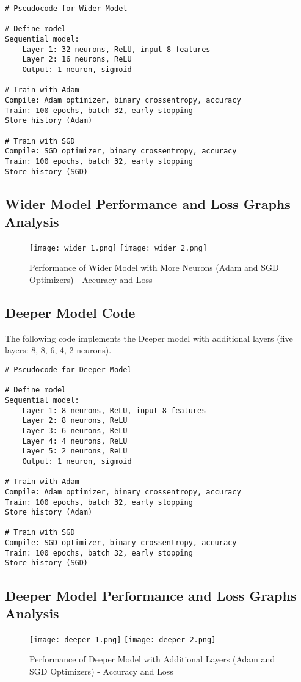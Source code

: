 \documentclass[a4paper,12pt]{article}
\begin{document}
\begin{verbatim}
# Pseudocode for Wider Model

# Define model
Sequential model:
    Layer 1: 32 neurons, ReLU, input 8 features
    Layer 2: 16 neurons, ReLU
    Output: 1 neuron, sigmoid

# Train with Adam
Compile: Adam optimizer, binary crossentropy, accuracy
Train: 100 epochs, batch 32, early stopping
Store history (Adam)

# Train with SGD
Compile: SGD optimizer, binary crossentropy, accuracy
Train: 100 epochs, batch 32, early stopping
Store history (SGD)
\end{verbatim}
\newpage
\subsection*{Wider Model Performance and Loss Graphs Analysis}
\begin{figure}[h]
    \centering
    \texttt{[image: wider\_1.png]}
    \texttt{[image: wider\_2.png]}
    \caption{Performance of Wider Model with More Neurons (Adam and SGD Optimizers) - Accuracy and Loss }
\end{figure}

\subsection*{Deeper Model Code}
The following code implements the Deeper model with additional layers (five layers: 8, 8, 6, 4, 2 neurons).

\begin{verbatim}
# Pseudocode for Deeper Model

# Define model
Sequential model:
    Layer 1: 8 neurons, ReLU, input 8 features
    Layer 2: 8 neurons, ReLU
    Layer 3: 6 neurons, ReLU
    Layer 4: 4 neurons, ReLU
    Layer 5: 2 neurons, ReLU
    Output: 1 neuron, sigmoid

# Train with Adam
Compile: Adam optimizer, binary crossentropy, accuracy
Train: 100 epochs, batch 32, early stopping
Store history (Adam)

# Train with SGD
Compile: SGD optimizer, binary crossentropy, accuracy
Train: 100 epochs, batch 32, early stopping
Store history (SGD)
\end{verbatim}
\subsection*{Deeper Model Performance and Loss Graphs Analysis}
\begin{figure}[h]
    \centering
    \texttt{[image: deeper\_1.png]}
    \texttt{[image: deeper\_2.png]}
    \caption{Performance of Deeper Model with Additional Layers (Adam and SGD Optimizers) - Accuracy and Loss}
\end{figure}
\end{document}
